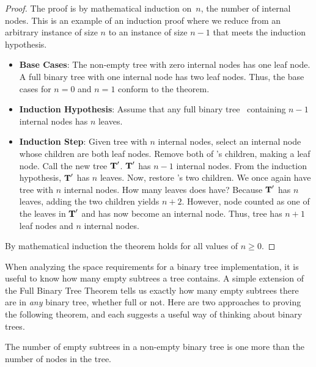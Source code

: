 \begin{proof}
The proof is by mathematical induction on~\(n\), the
number of internal nodes.
This is an example of an induction proof
where we reduce from an arbitrary instance of size \(n\) to an instance
of size \(n-1\) that meets the induction hypothesis.

\begin{itemize}

\item
{\bf Base Cases}: The non-empty tree with zero internal nodes has
one leaf node.
A full binary tree with one internal node has two leaf nodes.
Thus, the base cases for \(n = 0\) and \(n = 1\) conform to the theorem.

\item
{\bf Induction Hypothesis}: Assume that any full binary
tree~ containing \(n-1\) internal nodes has \(n\) leaves.

\item
{\bf Induction Step}:
Given tree  with \(n\) internal nodes, select an internal
node~ whose children are both leaf nodes.
Remove both of 's children, making  a leaf node.
Call the new tree \({\textbf{T}}'\).
\({\textbf{T}}'\) has \(n-1\) internal nodes.
From the induction hypothesis, \({\textbf{T}}'\) has \(n\) leaves.
Now, restore 's two children.
We once again have tree  with \(n\) internal nodes.
How many leaves does  have?
Because \({\textbf{T}}'\) has \(n\) leaves, adding the two children yields
\(n+2\).
However, node  counted as one of the leaves in \({\textbf{T}}'\)
and has now become an internal node.
Thus, tree  has \(n+1\) leaf nodes and \(n\) internal
nodes.

\end{itemize}

By mathematical induction the theorem holds for all values of
\(n \geq 0\).
\end{proof}
\medskip

When analyzing the space requirements for a binary tree
implementation,
it is useful to know how many empty subtrees a tree contains.
A simple extension of the Full Binary Tree Theorem tells us exactly
how many empty subtrees there are in \emph{any} binary tree, whether
full or not.
Here are two approaches to proving the following theorem, and
each suggests a useful way of thinking about binary trees.

\begin{theorem}
\label{SubTreeThrm}
The number of empty subtrees in a non-empty binary tree is one
more than the number of nodes in the tree.
\end{theorem}

